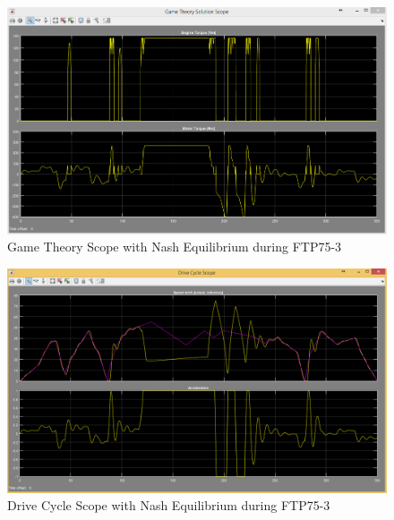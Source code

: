 
\begin{figure}[h]
\centering
\includegraphics[scale=0.4]{figures/NashEquilibrium/FTP75-3/gameTheory15Juni}
\caption{Game Theory Scope with Nash Equilibrium during FTP75-3}
\label{fig:gtne3}
\end{figure}

\begin{figure}[h]
\centering
\includegraphics[scale=0.4]{figures/NashEquilibrium/FTP75-3/driveCycle15Juni}
\caption{Drive Cycle Scope with Nash Equilibrium during FTP75-3}
\label{fig:dcne3}
\end{figure}

